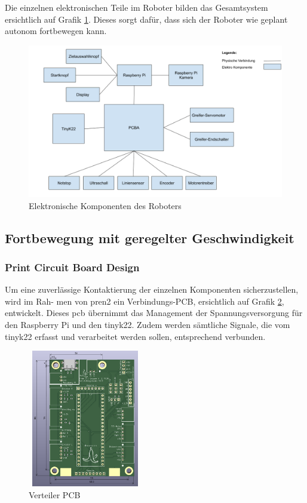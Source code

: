 Die einzelnen elektronischen Teile im Roboter bilden das Gesamtsystem ersichtlich auf Grafik \ref{fig:electro-components}. Dieses sorgt dafür, dass sich der Roboter wie geplant autonom fortbewegen kann.

\begin{figure}[H]
\centering
\includegraphics[width=\textwidth]{assets/gesamtkonzept/electronics.png}
\caption{Elektronische Komponenten des Roboters}
\label{fig:electro-components}
\end{figure} 

\newpage

\subsection{Fortbewegung mit geregelter Geschwindigkeit}

\subsubsection{Print Circuit Board Design}
\label{pcb}

Um eine zuverlässige Kontaktierung der einzelnen Komponenten sicherzustellen, wird im Rah-
men von \acrshort{pren2} ein Verbindungs-PCB, ersichtlich auf Grafik \ref{fig: Verteiler PCB}, entwickelt. Dieses \acrshort{pcb} übernimmt das Management der
Spannungsversorgung für den Raspberry Pi und den \gls{tinyk22}. Zudem werden sämtliche Signale,
die vom \gls{tinyk22} erfasst und verarbeitet werden sollen, entsprechend verbunden.

\begin{figure}[H]
\centering
\includegraphics[width=5cm, height=6cm]{assets/ET/PCB/VerteilerPCB_unbestueckt.png}
\caption{Verteiler PCB}
\label{fig: Verteiler PCB}
\end{figure}

